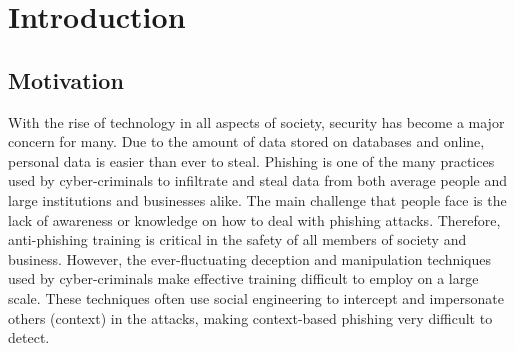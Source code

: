 \documentclass{l4proj}
\begin{document}
\tableofcontents

%
%
%
%
%
%
%
\chapter{Introduction}

\section{Motivation}

With the rise of technology in all aspects of society, security has become a major concern for many. Due to the amount of data stored on databases and online, personal data is easier than ever to steal. Phishing is one of the many practices used by cyber-criminals to infiltrate and steal data from both average people and large institutions and businesses alike. The main challenge that people face is the lack of awareness or knowledge on how to deal with phishing attacks. Therefore, anti-phishing training is critical in the safety of all members of society and business. However, the ever-fluctuating deception and manipulation techniques used by cyber-criminals make effective training difficult to employ on a large scale. These techniques often use social engineering to intercept and impersonate others (context) in the attacks, making context-based phishing very difficult to detect.
\end{document}

